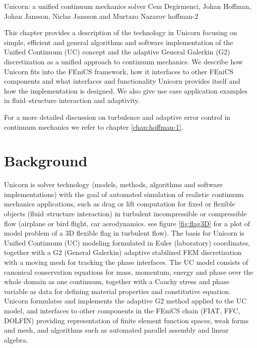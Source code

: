              {Unicorn: a unified continuum mechanics solver}
              {Cem Degirmenci, Johan Hoffman, Johan Jansson, Niclas Jansson and Murtazo Nazarov}
              {hoffman-2}

This chapter provides a description of the technology in Unicorn focusing
on simple, efficient and general algorithms and software implementation
of the Unified Continuum (UC) concept and the adaptive General Galerkin
(G2) discretization as a unified approach to continuum mechanics. We
describe how Unicorn fits into the FEniCS framework, how it interfaces
to other FEniCS components and what interfaces and functionality Unicorn
provides itself and how the implementation is designed. We also give use
case application examples in fluid--structure interaction and adaptivity.

For a more detailed discussion on turbulence and adaptive error control
in continuum mechanics we refer to chapter \ref{chap:hoffman-1}.


\section{Background}

Unicorn is solver technology (models, methods, algorithms and software
implementations) with the goal of automated simulation of realistic
continuum mechanics applications, such as drag or lift computation for
fixed or flexible objects (fluid--structure interaction) in turbulent
incompressible or compressible flow (airplane or bird flight, car
aerodynamics. see figure \ref{fig:flag3D} for a plot of model problem
of a 3D flexible flag in turbulent flow). The basis for Unicorn is
Unified Continuum (UC) modeling formulated in Euler (laboratory)
coordinates, together with a G2 (General Galerkin) adaptive stabilized
FEM discretization with a moving mesh for tracking the phase
interfaces. The UC model consists of canonical conservation equations
for mass, momentum, energy and phase over the whole domain as one
continuum, together with a Cauchy stress and phase variable as data
for defining material properties and constitutive equation. Unicorn
formulates and implements the adaptive G2 method applied to the UC
model, and interfaces to other components in the FEniCS chain (FIAT,
FFC, DOLFIN) providing representation of finite element function
spaces, weak forms and mesh, and algorithms such as automated parallel
assembly and linear algebra.

